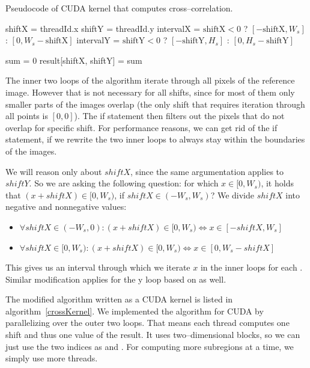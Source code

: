 \begin{algorithm}
	\caption{Pseudocode of CUDA kernel that computes cross--correlation.}
	\label{crossKernel}
	
	shiftX = threadId.x\;
	shiftY = threadId.y\;
	intervalX = $\text{shiftX} < 0$ ? $[-\text{shiftX}, W_s]$ : $[0, W_s - \text{shiftX}]$\;
	intervalY = $\text{shiftY} < 0$ ? $[-\text{shiftY}, H_s]$ : $[0, H_s - \text{shiftY}]$\;
		
	sum = 0\;
	\For{$x \in [0, \text{intervalX})$}{
		\For{$y \in [0, \text{intervalY})$}{
			shiftedX = x + shiftX\;
			shiftedY = y + shiftY\;
			sum += reference[x,y] * deformed[shiftedX, shiftedY]\;
		}
	}
	result[shiftX, shiftY] = sum\;

\end{algorithm}

The inner two loops of the algorithm iterate through all pixels of the reference image. However that is not necessary for all shifts, since for most of them only smaller parts of the images overlap (the only shift that requires iteration through all points is $[0,0]$). The if statement then filters out the pixels that do not overlap for specific shift. For performance reasons, we can get rid of the if statement, if we rewrite the two inner loops to always stay within the boundaries of the images.

We will reason only about $shiftX$, since the same argumentation applies to $shiftY$. So we are asking the following question: for which $x \in [0, W_s)$, it holds that $(x + shiftX) \in [0, W_s)$, if $shiftX \in (-W_s, W_s)$? We divide $shiftX$ into negative and nonnegative values:
\begin{itemize}
	\item $\forall shiftX \in (-W_s, 0): (x + shiftX) \in [0, W_s) \iff x \in [-shiftX, W_s]$
	\item $\forall shiftX \in [0, W_s): (x + shiftX) \in [0, W_s) \iff x \in [0, W_s - shiftX]$
\end{itemize}
This gives us an interval through which we iterate $x$ in the inner loops for each . Similar modification applies for the y loop based on  as well.

The modified algorithm written as a CUDA kernel is listed in algorithm~\ref{crossKernel}. We implemented the algorithm for CUDA by parallelizing over the outer two loops. That means each thread computes one shift and thus one value of the result. It uses two--dimensional blocks, so we can just use the two indices as  and . For computing more subregions at a time, we simply use more threads.

